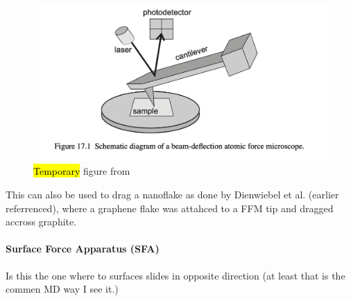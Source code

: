 \begin{figure}[H]
  \centering
  \includegraphics[width=0.6\linewidth]{figures/theory/AFM.png}
  \caption{\hl{Temporary} figure from \cite[p. 184]{gnecco_meyer_2015}}
  \label{fig:AFM}
\end{figure}


This can also be used to drag a nanoflake as done by Dienwiebel et al. \cite{DIENWIEBEL2005197} (earlier referrenced), where a graphene flake was attahced to a FFM tip and dragged accross graphite.




\paragraph*{Surface Force Apparatus (SFA)}

Is this the one where to surfaces slides in opposite direction (at least that is the commen MD way I see it.)

















